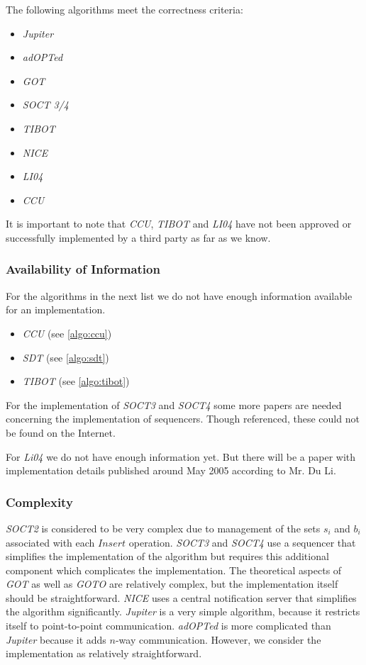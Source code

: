 The following algorithms meet the correctness criteria:
\begin{itemize}
 \item \emph{Jupiter}
 \item \emph{adOPTed}
 \item \emph{GOT}
 \item \emph{SOCT 3/4}
 \item \emph{TIBOT}
 \item \emph{NICE}
 \item \emph{LI04}
 \item \emph{CCU}
\end{itemize}

It is important to note that \emph{CCU}, \emph{TIBOT} and \emph{LI04} have not been approved or successfully implemented by a third party as far as we know.


\subsubsection{Availability of Information}
For the algorithms in the next list we do not have enough information available for an implementation.

\begin{itemize}
 \item \emph{CCU} (see \ref{algo:ccu})
 \item \emph{SDT} (see \ref{algo:sdt})
 \item \emph{TIBOT} (see \ref{algo:tibot})
\end{itemize}

For the implementation of \emph{SOCT3} and \emph{SOCT4} some more papers are needed concerning the implementation of sequencers. Though referenced, these could not be found on the Internet. 

For \emph{Li04} we do not have enough information yet. But there will be a paper with implementation details published around May 2005 according to Mr. Du Li.


\subsubsection{Complexity}
\emph{SOCT2} is considered to be very complex \cite{imine03b} \cite{sdt} due to management of the sets $s_i$ and $b_i$ associated with each $Insert$ operation. \emph{SOCT3} and \emph{SOCT4} use a sequencer that simplifies the implementation of the algorithm but requires this additional component which complicates the implementation. The theoretical aspects of \emph{GOT} as well as \emph{GOTO} are relatively complex, but the implementation itself should be straightforward. \emph{NICE} uses a central notification server that simplifies the algorithm significantly. \emph{Jupiter} is a very simple algorithm, because it restricts itself to point-to-point communication. \emph{adOPTed} is more complicated than \emph{Jupiter} because it adds $n$-way communication. However, we consider the implementation as relatively straightforward.  

